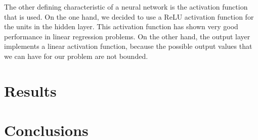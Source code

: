 \documentclass[a4paper, report, oneside, UKenglish]{memoir}
\begin{document}
The other defining characteristic of a neural network is the activation function that is used. On the one hand, we decided to use a ReLU activation function for the units in the hidden layer. This activation function has shown very good performance in linear regression problems. On the other hand, the output layer implements a linear activation function, because the possible output values that we can have for our problem are not bounded.


\chapter{Results} \label{ch:results}


\chapter{Conclusions}\label{ch:conclusions}

\clearpage
\printbibliography
\end{document}
